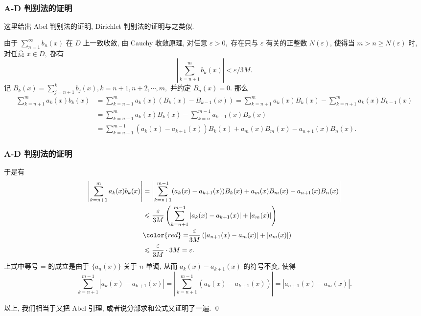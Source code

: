\begin{frame}
\frametitle{A-D 判别法的证明}

这里给出 Abel 判别法的证明, Dirichlet 判别法的证明与之类似.

\pause
\vspace{0.5em}

\startproof[bg=yellow, fg=red]
由于 $\displaystyle \sum_{n=1}^\infty b_n(x)$ 在 $D$ 上一致收敛, 由 Cauchy 收敛原理, 对任意 $\varepsilon > 0,$ 存在只与 $\varepsilon$ 有关的正整数 $N(\varepsilon)$, 使得当 $m > n \geqslant N(\varepsilon)$ 时, 对任意 $x \in D,$ 都有
\[
\left| \sum_{k=n+1}^m b_k(x) \right| < \varepsilon / 3M.
\]
记 $B_k(x) = \sum_{j=n+1}^k b_j(x), k = n+1, n+2, \cdots, m,$ 并约定 $B_{n}(x) = 0.$ 那么
\begin{align*}
\sum_{k=n+1}^m a_k(x) b_k(x) & = \sum_{k=n+1}^m a_k(x) (B_k(x) - B_{k-1}(x)) = \sum_{k=n+1}^m a_k(x) B_k(x) - \sum_{k=n+1}^m a_k(x) B_{k-1}(x) \\
& = \sum_{k=n+1}^m a_k(x) B_k(x) - \sum_{k=n}^{m-1} a_{k+1}(x) B_k(x) \\
& = \sum_{k=n+1}^{m-1} (a_k(x) - a_{k+1}(x)) B_k(x) + a_m(x) B_m(x) - a_{n+1}(x) B_{n}(x).
\end{align*}

\end{frame}


\begin{frame}
\frametitle{A-D 判别法的证明}

于是有
\begin{align*}
\left| \sum_{k=n+1}^m a_k(x) b_k(x) \right| & = \left| \sum_{k=n+1}^{m-1} (a_k(x) - a_{k+1}(x)) B_k(x) + a_m(x) B_m(x) - a_{n+1}(x) B_{n}(x) \right| \\
& \leqslant \frac{\varepsilon}{3M} \left( \sum_{k=n+1}^{m-1} |a_k(x) - a_{k+1}(x)| + |a_m(x)| \right) \\
& {\color{red} =} \frac{\varepsilon}{3M} \left( |a_{n+1}(x) - a_m(x)| + |a_m(x)| \right) \\
& \leqslant \frac{\varepsilon}{3M} \cdot 3M = \varepsilon.
\end{align*}
上式中等号 {\color{red} =} 的成立是由于 $\{a_n(x)\}$ 关于 $n$ 单调, 从而 $a_k(x) - a_{k+1}(x)$ 的符号不变, 使得
\[
\sum_{k=n+1}^{m-1} |a_k(x) - a_{k+1}(x)| = \left| \sum_{k=n+1}^{m-1} (a_k(x) - a_{k+1}(x)) \right| = |a_{n+1}(x) - a_m(x)|.
\]

以上, 我们相当于又把 Abel 引理, 或者说分部求和公式又证明了一遍.
\qed

\end{frame}

